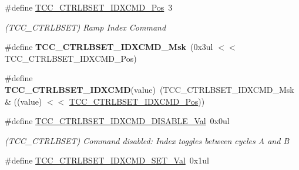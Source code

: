 \begin{DoxyCompactItemize}
\item 
\hypertarget{group___s_a_m_l21___t_c_c_gad1a19b5640a5a4f1da6cd99bf0f2cfcd}{}\#define \hyperlink{group___s_a_m_l21___t_c_c_gad1a19b5640a5a4f1da6cd99bf0f2cfcd}{T\+C\+C\+\_\+\+C\+T\+R\+L\+B\+S\+E\+T\+\_\+\+I\+D\+X\+C\+M\+D\+\_\+\+Pos}~3\label{group___s_a_m_l21___t_c_c_gad1a19b5640a5a4f1da6cd99bf0f2cfcd}

\begin{DoxyCompactList}\small\item\em (T\+C\+C\+\_\+\+C\+T\+R\+L\+B\+S\+E\+T) Ramp Index Command \end{DoxyCompactList}\item 
\hypertarget{group___s_a_m_l21___t_c_c_ga5e28e50439bbae9f532b05ec9cf2748c}{}\#define {\bfseries T\+C\+C\+\_\+\+C\+T\+R\+L\+B\+S\+E\+T\+\_\+\+I\+D\+X\+C\+M\+D\+\_\+\+Msk}~(0x3ul $<$$<$ T\+C\+C\+\_\+\+C\+T\+R\+L\+B\+S\+E\+T\+\_\+\+I\+D\+X\+C\+M\+D\+\_\+\+Pos)\label{group___s_a_m_l21___t_c_c_ga5e28e50439bbae9f532b05ec9cf2748c}

\item 
\hypertarget{group___s_a_m_l21___t_c_c_ga4310ac0754dde5746b85ac09c84057a2}{}\#define {\bfseries T\+C\+C\+\_\+\+C\+T\+R\+L\+B\+S\+E\+T\+\_\+\+I\+D\+X\+C\+M\+D}(value)~(T\+C\+C\+\_\+\+C\+T\+R\+L\+B\+S\+E\+T\+\_\+\+I\+D\+X\+C\+M\+D\+\_\+\+Msk \& ((value) $<$$<$ \hyperlink{group___s_a_m_l21___t_c_c_gad1a19b5640a5a4f1da6cd99bf0f2cfcd}{T\+C\+C\+\_\+\+C\+T\+R\+L\+B\+S\+E\+T\+\_\+\+I\+D\+X\+C\+M\+D\+\_\+\+Pos}))\label{group___s_a_m_l21___t_c_c_ga4310ac0754dde5746b85ac09c84057a2}

\item 
\hypertarget{group___s_a_m_l21___t_c_c_ga3113b66d22bc9182c8ba47fa573c4c94}{}\#define \hyperlink{group___s_a_m_l21___t_c_c_ga3113b66d22bc9182c8ba47fa573c4c94}{T\+C\+C\+\_\+\+C\+T\+R\+L\+B\+S\+E\+T\+\_\+\+I\+D\+X\+C\+M\+D\+\_\+\+D\+I\+S\+A\+B\+L\+E\+\_\+\+Val}~0x0ul\label{group___s_a_m_l21___t_c_c_ga3113b66d22bc9182c8ba47fa573c4c94}

\begin{DoxyCompactList}\small\item\em (T\+C\+C\+\_\+\+C\+T\+R\+L\+B\+S\+E\+T) Command disabled\+: Index toggles between cycles A and B \end{DoxyCompactList}\item 
\hypertarget{group___s_a_m_l21___t_c_c_gac1e67bc915ada5b5c8f1b030ea84d130}{}\#define \hyperlink{group___s_a_m_l21___t_c_c_gac1e67bc915ada5b5c8f1b030ea84d130}{T\+C\+C\+\_\+\+C\+T\+R\+L\+B\+S\+E\+T\+\_\+\+I\+D\+X\+C\+M\+D\+\_\+\+S\+E\+T\+\_\+\+Val}~0x1ul\label{group___s_a_m_l21___t_c_c_gac1e67bc915ada5b5c8f1b030ea84d130}


\end{DoxyCompactItemize}
